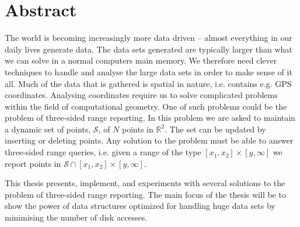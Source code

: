 \documentclass[twoside,11pt,openright]{report}
\begin{document}
\pagestyle{empty} 
\vspace*{\fill}
\clearpage



\chapter*{Abstract}
\pagestyle{plain}

The world is becoming increasingly more data driven -- almost everything in our daily lives generate data. The data sets generated are typically larger than what we can solve in a normal computers main memory. We therefore need clever techniques to handle and analyse the large data sets in order to make sense of it all. Much of the data that is gathered is spatial in nature, i.e. contains e.g. GPS coordinates. Analysing coordinates require us to solve complicated problems within the field of computational geometry. One of such problems could be the problem of three-sided range reporting. In this problem we are asked to maintain a dynamic set of points, $\mathcal{S}$, of $N$ points in $\mathbb{R}^2$. The set can be updated by inserting or deleting points. Any solution to the problem must be able to answer three-sided range queries, i.e. given a range of the type $\left[x_1,x_2\right]\times \left[y,\infty\right]$ we report points in $\mathcal{S} \cap \left[x_1,x_2\right]\times \left[y,\infty\right]$.

This thesis presents, implement, and experiments with several solutions to the problem of three-sided range reporting. The main focus of the thesis will be to show the power of data structures optimized for handling huge data sets by minimising the number of disk accesses.
\end{document}
